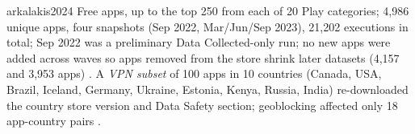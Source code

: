 \begin{papercard}{arkalakis2024}
 Free apps, up to the top 250 from each of 20 Play categories; 4,986 unique apps, four snapshots (Sep 2022, Mar/Jun/Sep 2023), 21,202 executions in total; Sep 2022 was a preliminary Data Collected-only run; no new apps were added across waves so apps removed from the store shrink later datasets (4,157 and 3,953 apps) . A \emph{VPN subset} of 100 apps in 10 countries (Canada, USA, Brazil, Iceland, Germany, Ukraine, Estonia, Kenya, Russia, India) re-downloaded the country store version and Data Safety section; geoblocking affected only 18 app-country pairs .


\end{papercard}
